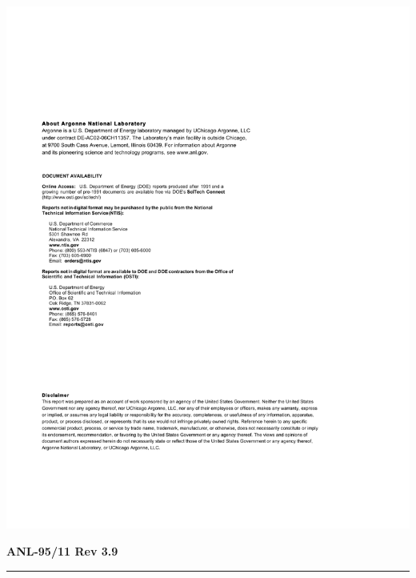 \newpage
\centerline{\includegraphics{ArgonneReportTemplatePage2}}
\newpage

\hfill {\large {\bf ANL-95/11 Rev 3.9}}

\vspace*{2in}
\vspace*{8pt}
\hrule
\vspace*{8pt}

